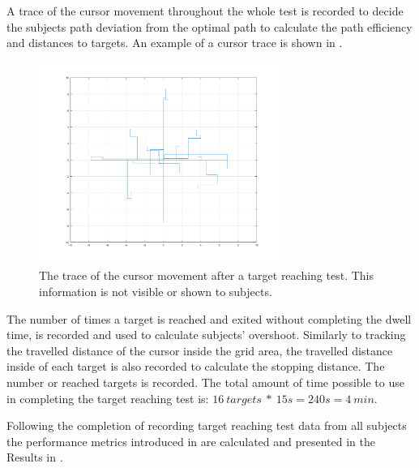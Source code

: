A trace of the cursor movement throughout the whole test is recorded to decide the subjects path deviation from the optimal path to calculate the path efficiency and distances to targets. An example of a cursor trace is shown in . 

\begin{figure}[H] 
	\includegraphics[width=0.7\textwidth]{figures/pMethods/trajectory}
	\caption{The trace of the cursor movement after a target reaching test. This information is not visible or shown to subjects.}
	\label{fig:cursorTrace}
\end{figure}
The number of times a target is reached and exited without completing the dwell time, is recorded and used to calculate subjects' overshoot. Similarly to tracking the travelled distance of the cursor inside the grid area, the travelled distance inside of each target is also recorded to calculate the stopping distance. The number or reached targets is recorded. The total amount of time possible to use in completing the target reaching test is: $16 ~targets~*~15s = 240s = 4~min$. 

Following the completion of recording target reaching test data from all subjects the performance metrics introduced in  are calculated and presented in the Results in .




